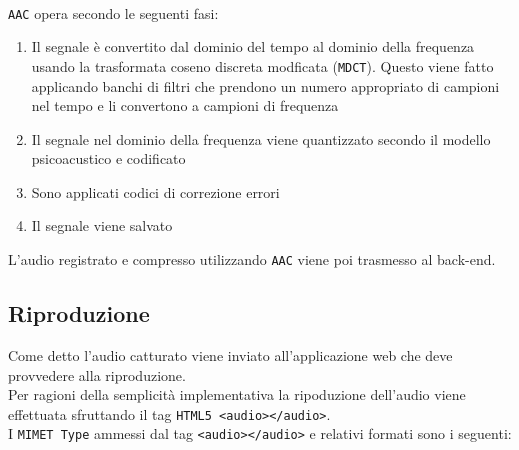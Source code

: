 \\

\texttt{AAC} opera secondo le seguenti fasi:

\begin{enumerate}
	\item Il segnale è convertito dal dominio del tempo al dominio della frequenza usando la trasformata coseno discreta modficata (\texttt{MDCT}). Questo viene fatto applicando banchi di filtri che prendono un numero appropriato di campioni nel tempo e li convertono a campioni di frequenza
	\item Il segnale nel dominio della frequenza viene quantizzato secondo il modello psicoacustico e codificato
	\item Sono applicati codici di correzione errori
	\item Il segnale viene salvato
\end{enumerate}

L'audio registrato e compresso utilizzando \texttt{AAC} viene poi trasmesso al back-end.

\subsection{Riproduzione}
Come detto l'audio catturato viene inviato all'applicazione web che deve provvedere alla riproduzione.\\
Per ragioni della semplicità implementativa la ripoduzione dell'audio viene effettuata sfruttando il tag \texttt{HTML5 <audio></audio>}.\\
I \texttt{MIMET Type} ammessi dal tag \texttt{<audio></audio>} e relativi formati sono i seguenti:

